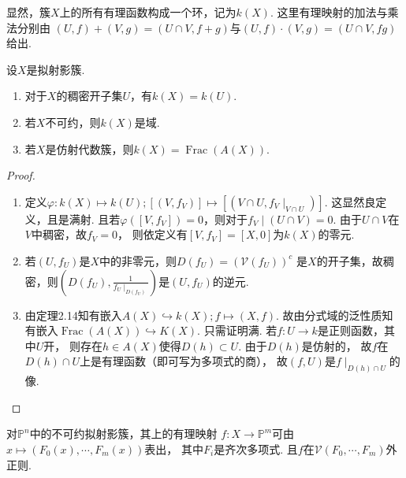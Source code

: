     显然，簇$X$上的所有有理函数构成一个环，记为$k(X)$. 这里有理映射的加法与乘法分别由
    $(U,f)+(V,g)=(U \cap V,f+g)$与$(U,f)\cdot(V,g)=(U \cap V,fg)$给出.
    \begin{proposition}
        设$X$是拟射影簇.
        \begin{enumerate}
            \item[(1)] 对于$X$的稠密开子集$U$，有$k(X)=k(U)$.
            \item[(2)] 若$X$不可约，则$k(X)$是域.
            \item[(3)] 若$X$是仿射代数簇，则$k(X)=\operatorname{Frac}(A(X))$.
        \end{enumerate}
    \end{proposition}
    \begin{proof}
        \begin{enumerate}
            \item[(1)] 定义$\varphi\colon k(X) \mapsto k(U);[(V,f_{V})] \mapsto [(V \cap U,f_{V}\mid_{V \cap U})]$.
                       这显然良定义，且是满射. 
                       且若$\varphi([V,f_{V}])=0$，则对于$f_{V}\mid(U \cap V)=0$. 
                       由于$U \cap V$在$V$中稠密，故$f_{V}=0$，
                       则依定义有$[V,f_{V}]=[X,0]$为$k(X)$的零元.
            \item[(2)] 若$(U,f_{U})$是$X$中的非零元，则$D(f_{U}) = (\mathcal{V}(f_{U}))^{c}$
                       是$X$的开子集，故稠密，则$(D(f_{U}),\frac{1}{f_{U}\mid_{D(f_{U})}})$是$(U,f_{U})$的逆元.
            \item[(3)] 由定理2.14知有嵌入$A(X) \hookrightarrow k(X);f \mapsto (X,f)$. 
                       故由分式域的泛性质知有嵌入$\operatorname{Frac}(A(X)) \hookrightarrow K(X)$.
                       只需证明满. 若$f\colon U \rightarrow k$是正则函数，其中$U$开，
                       则存在$h \in A(X)$使得$D(h) \subset U$. 由于$D(h)$是仿射的，
                       故$f$在$D(h) \cap U$上是有理函数（即可写为多项式的商），
                       故$(f,U)$是$f\mid_{D(h) \cap U}$的像.\qedhere
        \end{enumerate}
    \end{proof}

    \begin{remark}
        对$\mathbb{P}^{n}$中的不可约拟射影簇，其上的有理映射
        $f\colon X \rightarrow \mathbb{P}^{m}$可由
        $x \mapsto (F_{0}(x),\cdots,F_{m}(x))$表出，
        其中$F_{i}$是齐次多项式. 且$f$在$\mathcal{V}(F_{0},\cdots,F_{m})$外正则.
    \end{remark}

